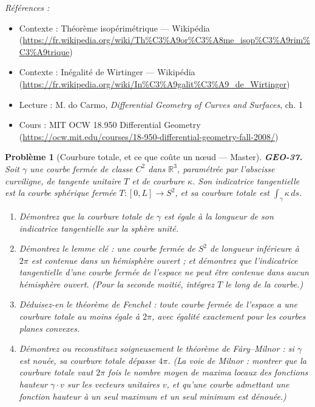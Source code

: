 \documentclass[11pt]{article}
\newtheorem{problem}{Problème}
\newenvironment{refs}{\par\small\noindent\emph{Références :}\begin{itemize}\setlength\itemsep{0pt}}{\end{itemize}\normalsize}
\begin{document}
\begin{refs}
\item Contexte : Théorème isopérimétrique --- Wikipédia (\url{https://fr.wikipedia.org/wiki/Th%C3%A9or%C3%A8me_isop%C3%A9rim%C3%A9trique})
\item Contexte : Inégalité de Wirtinger --- Wikipédia (\url{https://fr.wikipedia.org/wiki/In%C3%A9galit%C3%A9_de_Wirtinger})
\item Lecture : M. do Carmo, \textit{Differential Geometry of Curves and Surfaces}, ch. 1
\item Cours : MIT OCW 18.950 Differential Geometry (\url{https://ocw.mit.edu/courses/18-950-differential-geometry-fall-2008/})
\end{refs}

\bigskip

\begin{problem}[{Courbure totale, et ce que coûte un n\oe{}ud --- Master}]
\textbf{GEO-37.} Soit $ \gamma $ une courbe fermée de classe $ C^2 $ dans
$ \mathbb{R}^3 $, paramétrée par l'abscisse curviligne, de tangente unitaire $ T $ et de
courbure $ \kappa $. Son \textit{indicatrice tangentielle} est la courbe sphérique fermée
$ T : [0, L] \to S^2 $, et sa courbure totale est $ \int_\gamma \kappa \, ds $.
\begin{enumerate}
\item[(a)] Démontrez que la courbure totale de $ \gamma $ est égale à la longueur de son indicatrice
tangentielle sur la sphère unité.
\item[(b)] Démontrez le lemme clé : une courbe fermée de $ S^2 $ de longueur inférieure à $ 2\pi $ est
contenue dans un hémisphère ouvert ; et démontrez que l'indicatrice tangentielle d'une courbe
fermée de l'espace ne peut être contenue dans aucun hémisphère ouvert. (Pour la seconde moitié,
intégrez $ T $ le long de la courbe.)
\item[(c)] Déduisez-en le théorème de Fenchel : toute courbe fermée de l'espace a une courbure totale au
moins égale à $ 2\pi $, avec égalité exactement pour les courbes planes convexes.
\item[(d)] Démontrez ou reconstituez soigneusement le théorème de Fáry--Milnor : si $ \gamma $ est
nouée, sa courbure totale dépasse $ 4\pi $. (La voie de Milnor : montrer que la courbure totale
vaut $ 2\pi $ fois le nombre moyen de maxima locaux des fonctions hauteur $ \gamma \cdot v $
sur les vecteurs unitaires $ v $, et qu'une courbe admettant une fonction hauteur à un seul
maximum et un seul minimum est dénouée.)
\end{enumerate}

\end{problem}
\end{document}
